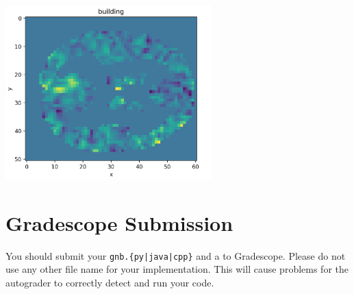 \documentclass[11pt,addpoints,answers]{exam}
\begin{document}
\begin{center}
\includegraphics[width=300px]{images/visualization.png}
\end{center}

\section{Gradescope Submission}
You should submit your \texttt{gnb.\{py|java|cpp\}} and a to Gradescope. Please do not use any other file name for your implementation. This will cause problems for the autograder to correctly detect and run your code.
\newpage
\end{document}
